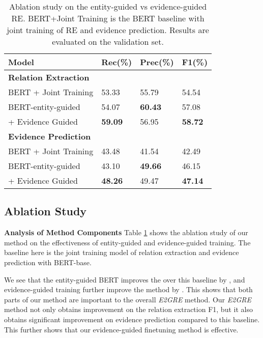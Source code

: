 \documentclass[11pt,a4paper]{article}
\begin{document}
\begin{table}[!h]
\begin{small}
\begin{center}
\begin{tabular}{|l|l|l|l|}
\hline \bf Model & \bf Rec(\%) & \bf Prec(\%) & \bf F1(\%)\\ \hline
\bf Relation Extraction & & & \\ \hline
BERT + Joint Training & 53.33 & 55.79 & 54.54 \\
BERT-entity-guided  & 54.07 & \bf 60.43 & 57.08\\ + Evidence Guided  &  \bf 59.09 &  56.95 &  \bf 58.72\\ \hline
\bf Evidence Prediction & & & \\ 
\hline
BERT + Joint Training & 43.48 & 41.54 & 42.49 \\
BERT-entity-guided  & 43.10 & \bf 49.66 & 46.15\\ + Evidence Guided  &  \bf 48.26 &  49.47 &  \bf 47.14 \\ 
\hline
\end{tabular}
\end{center}
\end{small}
\caption{\label{font-table} Ablation study on the entity-guided vs evidence-guided RE. BERT+Joint Training is the BERT baseline with joint training of RE and evidence prediction. Results are evaluated on the validation set.
}
\label{table:ablation}
\end{table}

\subsection{Ablation Study}
\noindent\textbf{Analysis of Method Components}
Table \ref{table:ablation} shows the ablation study of our method on the effectiveness of entity-guided and evidence-guided training. The baseline here is the joint training model of relation extraction and evidence prediction with BERT-base.

We see that the entity-guided BERT improves the over this baseline by , and evidence-guided training further improve the method by .
This shows that both parts of our method are important to the overall {\em E2GRE} method.
Our {\em E2GRE} method not only obtains improvement on the relation extraction F1, but it also obtains significant improvement on evidence prediction compared to this baseline. 
This further shows that our evidence-guided finetuning method is effective.
\end{document}
